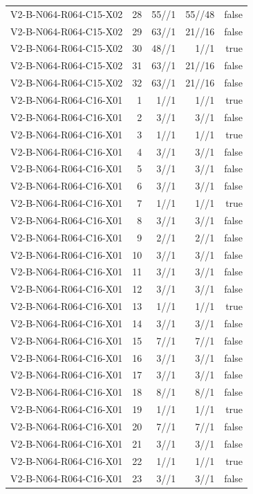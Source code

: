 {\begin{longtable}{lrrrr}
V2-B-N064-R064-C15-X02 & 28 & 55//1 & 55//48 & false \\
V2-B-N064-R064-C15-X02 & 29 & 63//1 & 21//16 & false \\
V2-B-N064-R064-C15-X02 & 30 & 48//1 & 1//1 & true \\
V2-B-N064-R064-C15-X02 & 31 & 63//1 & 21//16 & false \\
V2-B-N064-R064-C15-X02 & 32 & 63//1 & 21//16 & false \\
V2-B-N064-R064-C16-X01 & 1 & 1//1 & 1//1 & true \\
V2-B-N064-R064-C16-X01 & 2 & 3//1 & 3//1 & false \\
V2-B-N064-R064-C16-X01 & 3 & 1//1 & 1//1 & true \\
V2-B-N064-R064-C16-X01 & 4 & 3//1 & 3//1 & false \\
V2-B-N064-R064-C16-X01 & 5 & 3//1 & 3//1 & false \\
V2-B-N064-R064-C16-X01 & 6 & 3//1 & 3//1 & false \\
V2-B-N064-R064-C16-X01 & 7 & 1//1 & 1//1 & true \\
V2-B-N064-R064-C16-X01 & 8 & 3//1 & 3//1 & false \\
V2-B-N064-R064-C16-X01 & 9 & 2//1 & 2//1 & false \\
V2-B-N064-R064-C16-X01 & 10 & 3//1 & 3//1 & false \\
V2-B-N064-R064-C16-X01 & 11 & 3//1 & 3//1 & false \\
V2-B-N064-R064-C16-X01 & 12 & 3//1 & 3//1 & false \\
V2-B-N064-R064-C16-X01 & 13 & 1//1 & 1//1 & true \\
V2-B-N064-R064-C16-X01 & 14 & 3//1 & 3//1 & false \\
V2-B-N064-R064-C16-X01 & 15 & 7//1 & 7//1 & false \\
V2-B-N064-R064-C16-X01 & 16 & 3//1 & 3//1 & false \\
V2-B-N064-R064-C16-X01 & 17 & 3//1 & 3//1 & false \\
V2-B-N064-R064-C16-X01 & 18 & 8//1 & 8//1 & false \\
V2-B-N064-R064-C16-X01 & 19 & 1//1 & 1//1 & true \\
V2-B-N064-R064-C16-X01 & 20 & 7//1 & 7//1 & false \\
V2-B-N064-R064-C16-X01 & 21 & 3//1 & 3//1 & false \\
V2-B-N064-R064-C16-X01 & 22 & 1//1 & 1//1 & true \\
V2-B-N064-R064-C16-X01 & 23 & 3//1 & 3//1 & false \\

\end{longtable}}
